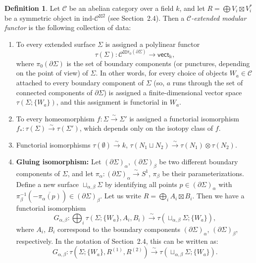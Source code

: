 \documentclass[11pt]{article}
\theoremstyle{definition}
\newtheorem{definition}[theorem]{Definition}
\begin{document}
\begin{definition}
Let $\mathcal{C}$ be an abelian category over a field $k$, and let $R=\bigoplus V_i \boxtimes V_i^* $ be a symmetric object in $\mathrm{ind}\text{-}\mathcal{C}^{\boxtimes 2}$ (see Section~2.4). Then a \emph{$\mathcal{C}$-extended modular functor} is the following collection of data:

\begin{enumerate}
\item[(i)] To every extended surface $\Sigma$ is assigned a polylinear functor
\[
\tau(\Sigma) \colon \mathcal{C}^{\boxtimes \pi_0(\partial \Sigma)} \longrightarrow \mathsf{vect}_\Bbbk,
\]
where $\pi_0(\partial \Sigma)$ is the set of boundary components (or punctures, depending on the point of view) of $\Sigma$. In other words, for every choice of objects $W_a \in \mathcal{C}$ attached to every boundary component of $\Sigma$ (so, $a$ runs through the set of connected components of $\partial \Sigma$) is assigned a finite-dimensional vector space $\tau(\Sigma; \{W_a\})$, and this assignment is functorial in $W_a$.

\item[(ii)] To every homeomorphism $f \colon \Sigma \xrightarrow{\sim} \Sigma'$ is assigned a functorial isomorphism $f_* \colon \tau(\Sigma) \xrightarrow{\sim} \tau(\Sigma')$, which depends only on the isotopy class of $f$.

\item[(iii)] Functorial isomorphisms $\tau(\emptyset) \xrightarrow{\sim} k$, $\tau(N_1 \sqcup N_2) \xrightarrow{\sim} \tau(N_1) \otimes \tau(N_2)$.

\item[(iv)] \textbf{Gluing isomorphism:} Let $(\partial \Sigma)_\alpha$, $(\partial \Sigma)_\beta$ be two different boundary components of $\Sigma$, and let $\pi_\alpha \colon (\partial \Sigma)_\alpha \xrightarrow{\sim} S^1$, $\pi_\beta$ be their parameterizations. Define a new surface $\sqcup_{\alpha,\beta} \Sigma$ by identifying all points $p \in (\partial \Sigma)_\alpha$ with $\pi_\beta^{-1}(-\overline{\pi_\alpha(p)}) \in (\partial \Sigma)_\beta$. Let us write $R = \bigoplus_i A_i \boxtimes B_i$. Then we have a functorial isomorphism
\begin{equation}
G_{\alpha,\beta} \colon \bigoplus_i \tau(\Sigma; \{W_a\}, A_i, B_i) \xrightarrow{\sim} \tau(\sqcup_{\alpha,\beta}\Sigma; \{W_a\}), \tag{5.1.1}
\end{equation}
where $A_i$, $B_i$ correspond to the boundary components $(\partial \Sigma)_\alpha$, $(\partial \Sigma)_\beta$, respectively. In the notation of Section~2.4, this can be written as:
\begin{equation}
G_{\alpha,\beta} \colon \tau(\Sigma; \{W_a\}, R^{(1)}, R^{(2)}) \xrightarrow{\sim} \tau(\sqcup_{\alpha,\beta}\Sigma; \{W_a\}). \tag{5.1.2}
\end{equation}
\end{enumerate}


\end{definition}
\end{document}
